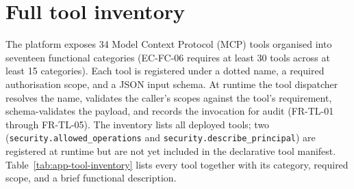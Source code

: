\documentclass[a4paper]{sapthesis}
\begin{document}
\section{Full tool inventory}
\label{app:tool-inventory}

The platform exposes 34 Model Context Protocol (MCP) tools organised
into seventeen functional categories (EC-FC-06 requires at least 30
tools across at least 15 categories).  Each tool is registered under a
dotted name, a required authorisation scope, and a JSON input schema.
At runtime the tool dispatcher resolves the name, validates the
caller's scopes against the tool's requirement, schema-validates the
payload, and records the invocation for audit (FR-TL-01 through
FR-TL-05).  The inventory lists all deployed tools; two
(\texttt{security.allowed\_operations} and
\texttt{security.describe\_principal}) are registered at runtime
but are not yet included in the declarative tool manifest.
Table~\ref{tab:app-tool-inventory} lists every tool
together with its category, required scope, and a brief functional
description.
\end{document}

